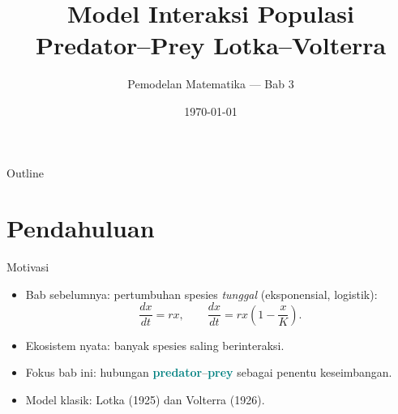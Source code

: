 \documentclass[aspectratio=32]{beamer}
\title{Model Interaksi Populasi\\Predator–Prey Lotka–Volterra}
\subtitle{Pemodelan Matematika — Bab 3}
\author{ }
\institute{ }
\date{\today}
\newcommand{\jsg}[1]{\textcolor{teal}{\textbf{#1}}}
\begin{document}
\begin{frame}
  \titlepage
\end{frame}

\begin{frame}{Outline}
  \tableofcontents
\end{frame}

\section{Pendahuluan}

\begin{frame}{Motivasi}
  \begin{itemize}
    \item Bab sebelumnya: pertumbuhan spesies \textit{tunggal}  (eksponensial, logistik):
      \begin{equation*}
         \frac{dx}{dt} = r x, \qquad
         \frac{dx}{dt} = r x\left(1 - \frac{x}{K}\right).
      \end{equation*}
    \item Ekosistem nyata: banyak spesies saling berinteraksi.
    \item Fokus bab ini: hubungan \jsg{predator}–\jsg{prey} sebagai penentu keseimbangan.
    \item Model klasik: Lotka (1925) dan Volterra (1926).
  \end{itemize}
\end{frame}
\end{document}
